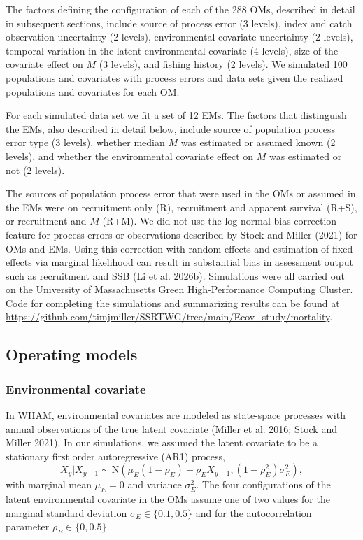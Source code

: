 \documentclass[
  12pt,
]{article}
\begin{document}
The factors defining the configuration of each of the 288 OMs, described
in detail in subsequent sections, include source of process error (3
levels), index and catch observation uncertainty (2 levels),
environmental covariate uncertainty (2 levels), temporal variation in
the latent environmental covariate (4 levels), size of the covariate
effect on \(M\) (3 levels), and fishing history (2 levels). We simulated
100 populations and covariates with process errors and data sets given
the realized populations and covariates for each OM.

For each simulated data set we fit a set of 12 EMs. The factors that
distinguish the EMs, also described in detail below, include source of
population process error type (3 levels), whether median \(M\) was
estimated or assumed known (2 levels), and whether the environmental
covariate effect on \(M\) was estimated or not (2 levels).

The sources of population process error that were used in the OMs or
assumed in the EMs were on recruitment only (R), recruitment and
apparent survival (R+S), or recruitment and \(M\) (R+M). We did not use
the log-normal bias-correction feature for process errors or
observations described by Stock and Miller (2021) for OMs and EMs. Using
this correction with random effects and estimation of fixed effects via
marginal likelihood can result in substantial bias in assessment output
such as recruitment and SSB (Li et al. 2026b). Simulations were all
carried out on the University of Massachusetts Green High-Performance
Computing Cluster. Code for completing the simulations and summarizing
results can be found at
\url{https://github.com/timjmiller/SSRTWG/tree/main/Ecov_study/mortality}.

\subsection*{Operating models}\label{operating-models}

\subsubsection*{Environmental covariate}\label{environmental-covariate}

In WHAM, environmental covariates are modeled as state-space processes
with annual observations of the true latent covariate (Miller et al.
2016; Stock and Miller 2021). In our simulations, we assumed the latent
covariate to be a stationary first order autoregressive (AR1) process,
\[
X_y|X_{y-1} \sim \text{N}\left(\mu_E\left(1-\rho_E\right) + \rho_E X_{y-1}, \left(1-\rho_E^2\right)\sigma^2_E\right),
\] with marginal mean \(\mu_E=0\) and variance \(\sigma^2_E\). The four
configurations of the latent environmental covariate in the OMs assume
one of two values for the marginal standard deviation
\(\sigma_E \in \{0.1, 0.5\}\) and for the autocorrelation parameter
\(\rho_E \in \{0, 0.5\}\).
\end{document}
